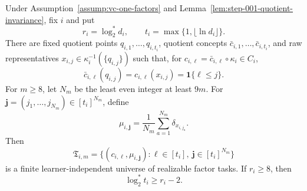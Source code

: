 \begin{lemma}
\label{lem:step-008-shelah-tasks}
Under Assumption~\ref{assump:vc-one-factors} and
Lemma~\ref{lem:step-001-quotient-invariance}, fix \(i\) and put
\begin{equation}\label{eq:step-008-witness-scales}
r_i=\log_2^*d_i,
\qquad
t_i=\max\{1,\lfloor\ln d_i\rfloor\}.
\end{equation}
There are fixed quotient points \(q_{i,1},\ldots,q_{i,t_i}\), quotient
concepts \(\bar c_{i,1},\ldots,\bar c_{i,t_i}\), and raw representatives
\(x_{i,j}\in\kappa_i^{-1}(\{q_{i,j}\})\) such that, for
\(c_{i,\ell}=\bar c_{i,\ell}\circ\kappa_i\in C_i\),
\begin{equation}\label{eq:step-008-threshold-pattern}
\bar c_{i,\ell}(q_{i,j})=c_{i,\ell}(x_{i,j})
=\mathbf1\{\ell\le j\}.
\end{equation}
For \(m\ge8\), let \(N_m\) be the least even integer at least \(9m\).
For \(\mathbf j=(j_1,\ldots,j_{N_m})\in[t_i]^{N_m}\), define
\begin{equation}\label{eq:step-008-task-measure}
\mu_{i,\mathbf j}=\frac1{N_m}\sum_{a=1}^{N_m}
\delta_{x_{i,j_a}}.
\end{equation}
Then
\begin{equation}\label{eq:step-008-task-universe}
\mathfrak T_{i,m}
=\{(c_{i,\ell},\mu_{i,\mathbf j}):
\ell\in[t_i],\ \mathbf j\in[t_i]^{N_m}\}
\end{equation}
is a finite learner-independent universe of realizable factor tasks.  If
\(r_i\ge8\), then
\begin{equation}\label{eq:step-008-logstar-shift}
\log_2^*t_i\ge r_i-2.
\end{equation}
\end{lemma}

